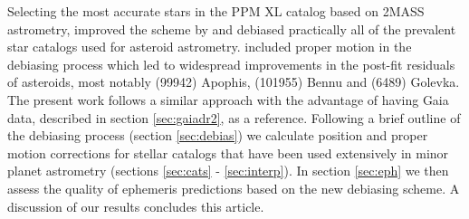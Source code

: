 \documentclass[review]{elsarticle}
\begin{document}
Selecting the most accurate stars in the PPM XL catalog based on 2MASS astrometry, \cite{farnocchia15} improved the scheme by \cite{chesley10} and debiased practically all of the prevalent star catalogs used for asteroid astrometry. \cite{farnocchia15} included proper motion in the debiasing process which led to widespread improvements in the post-fit residuals of asteroids, most notably (99942) Apophis, (101955) Bennu and (6489) Golevka. 
%
The present work follows a similar approach with the advantage of having Gaia data, described in section \ref{sec:gaiadr2}, as a reference. 
Following a brief outline of the debiasing process (section \ref{sec:debias}) we calculate position and proper motion corrections for stellar catalogs that have been used extensively in minor planet astrometry (sections \ref{sec:cats} - \ref{sec:interp}). 
In section \ref{sec:eph} we then assess the quality of ephemeris predictions based on the new debiasing scheme.
A discussion of our results concludes this article.
%
\end{document}
